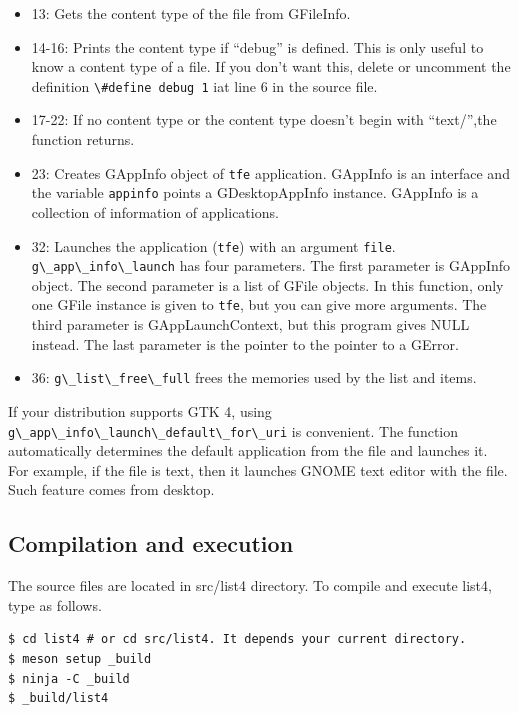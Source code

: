 \begin{itemize}
\tightlist
\item
  13: Gets the content type of the file from GFileInfo.
\item
  14-16: Prints the content type if ``debug'' is defined. This is only
  useful to know a content type of a file. If you don't want this,
  delete or uncomment the definition
  \passthrough{\lstinline!\#define debug 1!} iat line 6 in the source
  file.
\item
  17-22: If no content type or the content type doesn't begin with
  ``text/'',the function returns.
\item
  23: Creates GAppInfo object of \passthrough{\lstinline!tfe!}
  application. GAppInfo is an interface and the variable
  \passthrough{\lstinline!appinfo!} points a GDesktopAppInfo instance.
  GAppInfo is a collection of information of applications.
\item
  32: Launches the application (\passthrough{\lstinline!tfe!}) with an
  argument \passthrough{\lstinline!file!}.
  \passthrough{\lstinline!g\_app\_info\_launch!} has four parameters.
  The first parameter is GAppInfo object. The second parameter is a list
  of GFile objects. In this function, only one GFile instance is given
  to \passthrough{\lstinline!tfe!}, but you can give more arguments. The
  third parameter is GAppLaunchContext, but this program gives NULL
  instead. The last parameter is the pointer to the pointer to a GError.
\item
  36: \passthrough{\lstinline!g\_list\_free\_full!} frees the memories
  used by the list and items.
\end{itemize}

If your distribution supports GTK 4, using
\passthrough{\lstinline!g\_app\_info\_launch\_default\_for\_uri!} is
convenient. The function automatically determines the default
application from the file and launches it. For example, if the file is
text, then it launches GNOME text editor with the file. Such feature
comes from desktop.

\subsection{Compilation and execution}\label{compilation-and-execution}

The source files are located in src/list4 directory. To compile and
execute list4, type as follows.

\begin{lstlisting}
$ cd list4 # or cd src/list4. It depends your current directory.
$ meson setup _build
$ ninja -C _build
$ _build/list4
\end{lstlisting}


